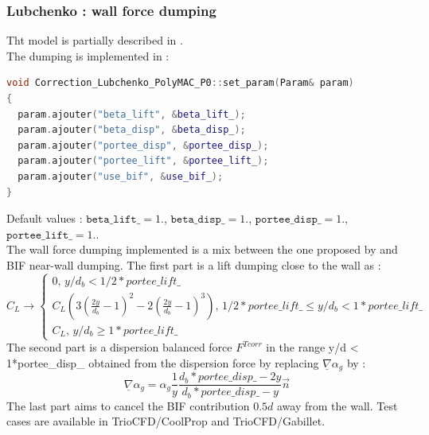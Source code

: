 \subsubsection{Lubchenko : wall force dumping}
Tht model is partially described in \textcite{LUBCHENKO201836}.\\
The dumping is implemented in :
\begin{lstlisting}[language=c++]
void Correction_Lubchenko_PolyMAC_P0::set_param(Param& param)
{
  param.ajouter("beta_lift", &beta_lift_);
  param.ajouter("beta_disp", &beta_disp_);
  param.ajouter("portee_disp", &portee_disp_);
  param.ajouter("portee_lift", &portee_lift_);
  param.ajouter("use_bif", &use_bif_);
}
\end{lstlisting}
Default values :   $\texttt{beta\_lift\_} =  1. $, $\texttt{beta\_disp\_}=  1. $, $\texttt{portee\_disp\_}= 1.$, $\texttt{portee\_lift\_}= 1.$.\\
The wall force dumping implemented is a mix between the one proposed by \textcite{Lubchenko2018} and BIF near-wall dumping.
The first part is a lift dumping close to the wall as :
\begin{equation}
	C_L \rightarrow \begin{cases} 0 \text{,~} y/d_b<1/2*portee\_lift\_  \\
	C_L\left(3\left(\frac{2y}{d_b}-1\right)^2-2\left(\frac{2y}{d_b}-1\right)^3\right) \text{,~} 1/2*portee\_lift\_ \leq y/d_b < 1*portee\_lift\_ \\
	C_L \text{,~} y/d_b\geq 1*portee\_lift\_ \end{cases}
\end{equation}
The second part is a dispersion balanced force $F^{Tcorr}$ in the range y/d < 1*portee\_disp\_  obtained from the dispersion force by replacing $\underline{\nabla}\alpha_g$ by :
\begin{equation}
	 \underline{\nabla}\alpha_g = \alpha_g\frac{1}{y}\frac{d_b*portee\_disp\_-2y}{d_b*portee\_disp\_-y}\overrightarrow{n}
\end{equation}
The last part aims to cancel the BIF contribution $0.5d$ away from the wall.
Test cases are available in TrioCFD/CoolProp and TrioCFD/Gabillet.

